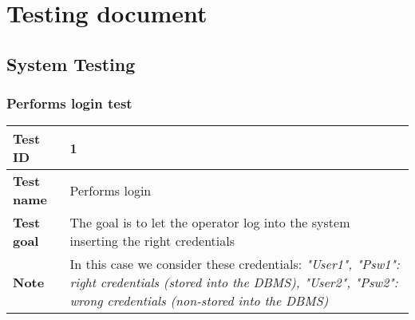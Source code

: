 \section{Testing document}{
	\subsection{System Testing}{
		\subsubsection{Performs login test}{
			\begin{table}[h]
			\begin{tabular}{|p{4cm}|p{10cm}|}
			\hline
				\centering \vspace{1mm} \bfseries{Test ID} \vspace{1mm} & 
				\vspace{1mm} 1 \vspace{1mm}\\
			\hline
				\centering \vspace{1mm} \bfseries{Test name} \vspace{1mm} & 
				\vspace{1mm} Performs login \vspace{1mm}\\
			\hline
				\centering \vspace{1mm} \bfseries{Test goal} \vspace{1mm} & 
				\vspace{1mm} The goal is to let the operator log into the system inserting the right credentials \vspace{1mm}\\
			\hline
				\centering \vspace{1mm} \bfseries{Note} \vspace{1mm} & 
				\vspace{1mm} In this case we consider these credentials: \itshape{"User1", "Psw1"}: right credentials (stored into the DBMS), \itshape{"User2", "Psw2"}: wrong 	credentials (non-stored into the DBMS) \vspace{1mm}\\
			\hline
			\end{tabular}
			\end{table}

}}}
